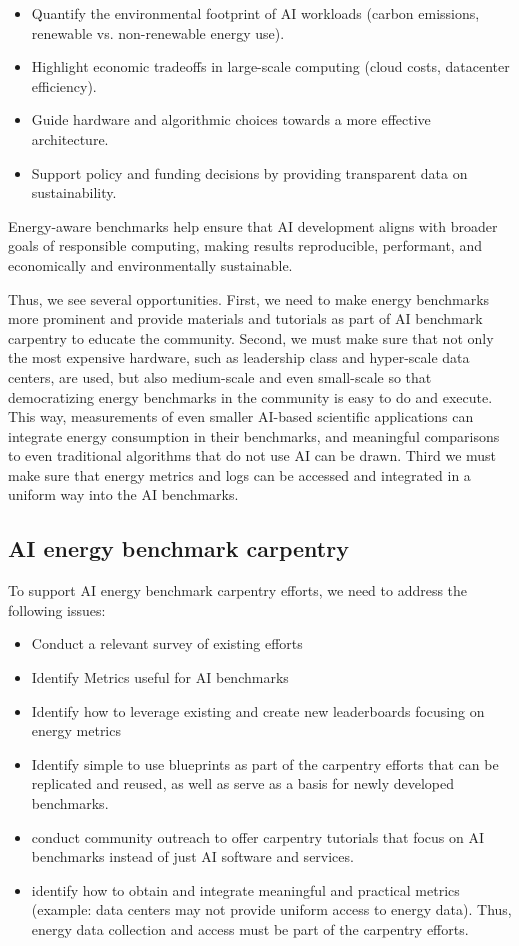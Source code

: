 \begin{itemize}
     \item Quantify the environmental footprint of AI workloads (carbon emissions, renewable vs. non-renewable energy use).
     \item Highlight economic tradeoffs in large-scale computing (cloud costs, datacenter efficiency). 
     \item Guide hardware and algorithmic choices towards a more effective architecture.
     \item Support policy and funding decisions by providing transparent data on sustainability. 
 \end{itemize}

Energy-aware benchmarks help ensure that AI development aligns with broader goals of responsible computing, making results reproducible, performant, and economically and environmentally sustainable. 

Thus, we see several opportunities. First, we need to make energy benchmarks more prominent and provide materials and tutorials as part of AI benchmark carpentry to educate the community. Second, we must make sure that not only the most expensive hardware, such as leadership class and hyper-scale data centers, are used, but also medium-scale and even small-scale so that democratizing energy benchmarks in the community is easy to do and execute. This way, measurements of even smaller AI-based scientific applications can integrate energy consumption in their benchmarks, and meaningful comparisons to even traditional algorithms that do not use AI can be drawn. Third we must make sure that energy metrics and logs can be accessed and integrated in a uniform way into the AI benchmarks.

\subsection{AI energy benchmark carpentry}

To support AI energy benchmark carpentry efforts, we need to address the following issues:

\begin{itemize}
\item Conduct a relevant survey of existing efforts
\item Identify Metrics useful for AI benchmarks 
\item Identify how to leverage existing and create new leaderboards focusing on energy metrics
\item Identify simple to use blueprints as part of the carpentry efforts that can be replicated and reused, as well as serve as a basis for newly developed benchmarks.
\item conduct community outreach to offer carpentry tutorials that focus on AI benchmarks instead of just AI software and services.
\item identify how to obtain and integrate meaningful and practical metrics (example: data centers may not provide uniform access to energy data). Thus, energy data collection and access must be part of the carpentry efforts.
\end{itemize}

